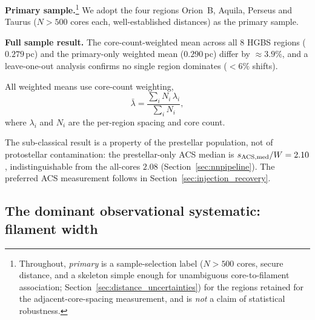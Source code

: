 \documentclass[usenatbib,twoside,twocolumn]{mnras}
\begin{document}
\textbf{Primary sample.}\footnote{Throughout, \emph{primary} is a sample-selection label ($N>500$ cores, secure distance, and a skeleton simple enough for unambiguous core-to-filament association; Section~\ref{sec:distance_uncertainties}) for the regions retained for the adjacent-core-spacing measurement, and is \emph{not} a claim of statistical robustness.} We adopt the four regions Orion~B, Aquila, Perseus and Taurus ($N>500$ cores each, well-established distances) as the primary sample.

\textbf{Full sample result.} The core-count-weighted mean across all 8 HGBS regions ($0.279$\,pc) and the primary-only weighted mean ($0.290$\,pc) differ by $\approx3.9\%$, and a leave-one-out analysis confirms no single region dominates ($<6\%$ shifts).

All weighted means use core-count weighting,
\begin{equation}
\bar{\lambda} = \frac{\sum_i N_i\,\lambda_i}{\sum_i N_i},
\label{eq:weighting}
\end{equation}
where $\lambda_i$ and $N_i$ are the per-region spacing and core count.

The sub-classical result is a property of the prestellar population, not of protostellar contamination: the prestellar-only ACS median is $s_{\rm ACS,med}/W=2.10$, indistinguishable from the all-cores $2.08$ (Section~\ref{sec:nnpipeline}). The preferred ACS measurement follows in Section~\ref{sec:injection_recovery}.

\subsection{The dominant observational systematic: filament width}
\label{sec:widths}
\end{document}
